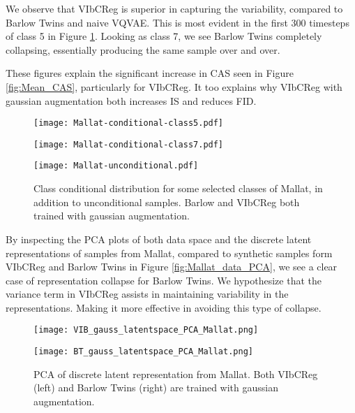 \documentclass[../../thesis.tex]{subfiles}
\begin{document}
We observe that VIbCReg is superior in capturing the variability, compared to Barlow Twins and naive VQVAE. This is most evident in the first 300 timesteps of class 5 in Figure \ref{fig:Gaussian_Mallat}. Looking as class 7, we see Barlow Twins completely collapsing, essentially producing the same sample over and over. \newline

These figures explain the significant increase in CAS seen in Figure \ref{fig:Mean_CAS}, particularly for VIbCReg. It too explains why VIbCReg with gaussian augmentation both increases IS and reduces FID. \newline

\begin{figure}[H]
    \centering
    \begin{minipage}[b]{0.32\textwidth}
        \centering
        \texttt{[image: Mallat-conditional-class5.pdf]}
    \end{minipage}
    \begin{minipage}[b]{0.32\textwidth}
        \centering
        \texttt{[image: Mallat-conditional-class7.pdf]}
    \end{minipage}
    \begin{minipage}[b]{0.32\textwidth}
        \centering
        \texttt{[image: Mallat-unconditional.pdf]}
    \end{minipage}
    \caption{Class conditional distribution for some selected classes of Mallat, in addition to unconditional samples. Barlow and VIbCReg both trained with gaussian augmentation.}
    \label{fig:Gaussian_Mallat}
\end{figure}

By inspecting the PCA plots of both data space and the discrete latent representations of samples from Mallat, compared to synthetic samples form VIbCReg and Barlow Twins in Figure \ref{fig:Mallat_data_PCA}, we see a clear case of representation collapse for Barlow Twins. We hypothesize that the variance term in VIbCReg assists in maintaining variability in the representations. Making it more effective in avoiding this type of collapse. 

\begin{figure}[H]
    \centering
    \begin{minipage}[b]{0.40\textwidth}
        \centering
        \texttt{[image: VIB\_gauss\_latentspace\_PCA\_Mallat.png]}
    \end{minipage}
    \begin{minipage}[b]{0.40\textwidth}
        \centering
        \texttt{[image: BT\_gauss\_latentspace\_PCA\_Mallat.png]}
    \end{minipage}
    \caption{PCA of discrete latent representation from Mallat. Both VIbCReg (left) and Barlow Twins (right) are trained with gaussian augmentation.}
    \label{fig:Mallat_latent_PCA}
\end{figure}
\end{document}

